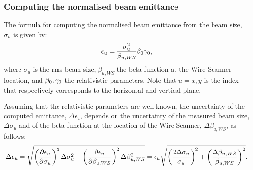 \subsubsection*{Computing the normalised beam emittance}
The formula for computing the normalised beam emittance from the beam size, $\sigma_u$ is given by:
\begin{equation}\label{eq:emittance_from_WS}
   \centering
   \epsilon_u = \frac{\sigma_u^2}{\beta_{u, WS}} \betarel \gammarel ,
\end{equation}
where $\sigma_u$ is the rms beam size, $\beta_{u, WS}$ the beta function at the Wire Scanner location, and ${\beta_0}, {\gamma_0}$ the relativistic parameters. Note that $u=x,y$ is the index that respectively corresponds to the horizontal and vertical plane.

Assuming that the relativistic parameters are well known, %
the uncertainty of the computed emittance, $\Delta \epsilon_u$, depends on the uncertainty of the measured beam size, $\Delta \sigma_u$ and of the beta function at the location of the Wire Scanner, $\Delta \beta_{u, WS}$, as follows:
\begin{equation}\label{eq:emittance_from_WS_uncertainty}
   \centering
   \Delta \epsilon_u = \sqrt{\left ( \frac{\partial \epsilon_u}{\partial \sigma_u}\right )^2 \Delta \sigma_u^2 + \left ( \frac{\partial \epsilon_u}{\partial \beta_{u, WS}} \right )^2 \Delta \beta_{u, WS}^2} = \epsilon_u  \sqrt{\left ( \frac{2 \Delta \sigma_u}{\sigma_u}\right )^2 + \left ( \frac{ \Delta \beta_{u, WS}}{\beta_{u, WS}} \right )^2} .
\end{equation}

